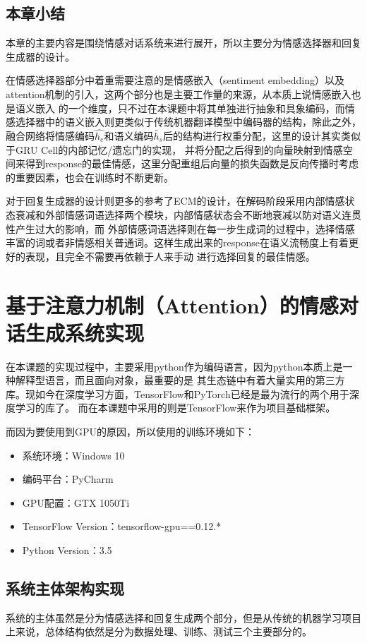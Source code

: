 \documentclass[supercite]{HustGraduPaper}
\theoremstyle{definition}
\begin{document}
\subsection{本章小结}
本章的主要内容是围绕情感对话系统来进行展开，所以主要分为情感选择器和回复生成器的设计。

在情感选择器部分中着重需要注意的是情感嵌入（sentiment embedding）以及attention机制的引入，这两个部分也是主要工作量的来源，从本质上说情感嵌入也是语义嵌入
的一个维度，只不过在本课题中将其单独进行抽象和具象编码，而情感选择器中的语义嵌入则更类似于传统机器翻译模型中编码器的结构，除此之外，
融合网络将情感编码$\widehat{h_e}$和语义编码$\widetilde{h_s}$后的结构进行权重分配，这里的设计其实类似于GRU Cell的内部记忆/遗忘门的实现，
并将分配之后得到的向量映射到情感空间来得到response的最佳情感，这里分配重组后向量的损失函数是反向传播时考虑的重要因素，也会在训练时不断更新。

对于回复生成器的设计则更多的参考了ECM\cite{DBLP:journals/corr/ZhouHZZL17}的设计，在解码阶段采用内部情感状态衰减和外部情感词语选择两个模块，内部情感状态会不断地衰减以防对语义连贯性产生过大的影响，而
外部情感词语选择则在每一步生成词的过程中，选择情感丰富的词或者非情感相关普通词。这样生成出来的response在语义流畅度上有着更好的表现，且完全不需要再依赖于人来手动
进行选择回复的最佳情感。

\section{基于注意力机制（Attention）的情感对话生成系统实现}
在本课题的实现过程中，主要采用python作为编码语言，因为python本质上是一种解释型语言，而且面向对象，最重要的是
其生态链中有着大量实用的第三方库。现如今在深度学习方面，TensorFlow和PyTorch已经是最为流行的两个用于深度学习的库了。
而在本课题中采用的则是TensorFlow来作为项目基础框架。

而因为要使用到GPU的原因，所以使用的训练环境如下：
\begin{itemize}
  \item 系统环境：Windows 10
  \item 编码平台：PyCharm
  \item GPU配置：GTX 1050Ti
  \item TensorFlow Version：tensorflow-gpu==0.12.*
  \item Python Version：3.5
\end{itemize}

\subsection{系统主体架构实现}
系统的主体虽然是分为情感选择和回复生成两个部分，但是从传统的机器学习项目上来说，总体结构依然是分为数据处理、训练、测试三个主要部分的。
\end{document}
